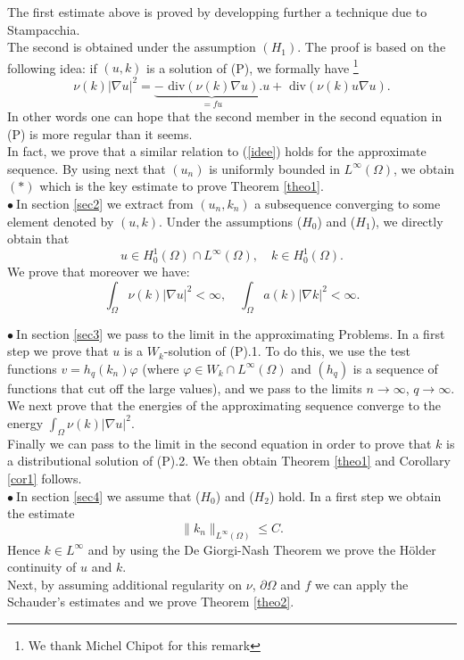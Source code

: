 \documentclass{elsart}
\begin{document}
The first estimate above is proved by developping further a technique due to Stampacchia. \\ 
The second is obtained under the assumption $(H_1)$. The proof is
based on the following idea: if $(u,k)$ is a solution of (P), we
formally have \footnote{We thank Michel Chipot for this remark}
\begin{equation}
\nu(k)| \nabla u|^2 = \underbrace{-\text{ div}(\nu(k) \nabla u).u}_{=fu} + 
\text{ div}(\nu(k) u \nabla u). \label{idee}
\end{equation}
In other words one can hope that the second member in the second
equation in (P) is more regular than it seems. \\
In fact, we prove that a similar relation to (\ref{idee}) holds for
the approximate sequence. By using next that $(u_n)$ is uniformly
bounded in $L^{\infty}(\Omega)$, we obtain $(*)$ which is the key
estimate to prove Theorem \ref{theo1}. \\ 

$\bullet \ $In section \ref{sec2} we extract from $(u_n,k_n)$ a 
subsequence converging to some element denoted by $(u,k)$. Under 
the assumptions ($H_0$) and ($H_1$), we directly obtain that 
$$u \in H^1_0(\Omega) \cap L^{\infty}(\Omega), \quad k \in
H^1_0(\Omega).$$
We prove that moreover we have: 
$$\int_{\Omega} \nu(k)|\nabla u|^2 < \infty, \quad \int_{\Omega}
a(k)|\nabla k|^2 < \infty.$$

$\bullet \ $In section \ref{sec3} we pass to the limit in the approximating
Problems. In a first step we prove that $u$ is a $W_k$-solution of
(P).1. To do this, we use the test functions $v=h_q(k_n)\varphi$ 
(where $\varphi \in W_k \cap L^{\infty}(\Omega)$ and $(h_q)$ is a
sequence of functions that cut off the large values), and we pass to the
limits $n \to \infty$, $q \to \infty$.\\ 
We next prove that the energies of the approximating sequence converge to
the energy $\int_{\Omega} \nu(k)|\nabla u|^2$. \\ 
Finally we can pass to the limit in the second equation in order to
prove that $k$ is a distributional solution of (P).2. We then obtain 
Theorem \ref{theo1} and Corollary \ref{cor1} follows. \\ 

$\bullet \ $In section \ref{sec4} we assume that ($H_0$) and ($H_2$)
hold. In a first step we obtain the estimate 
$$\|k_n\|_{L^{\infty}(\Omega)} \leq C.$$ 
Hence $k \in L^{\infty}$ and by using the De Giorgi-Nash Theorem we
prove the H\"{o}lder continuity of $u$ and $k$. \\ 
Next, by assuming additional regularity on $\nu$, $\partial
\Omega$ and $f$ we can apply the Schauder's estimates and we 
prove Theorem \ref{theo2}. \\ 
\end{document}
